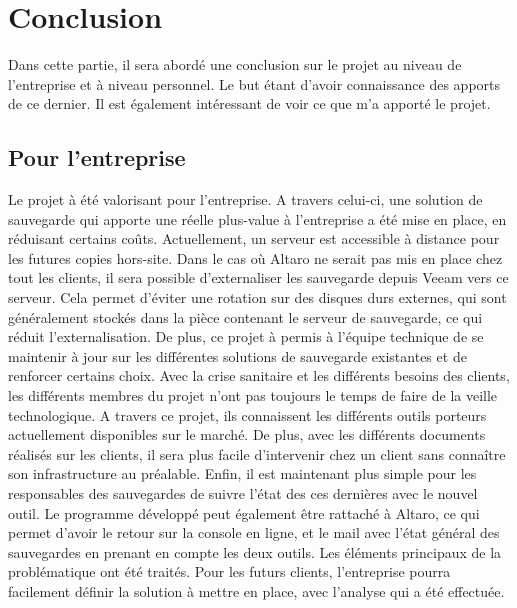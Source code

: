 \documentclass[pfe]{tnreport} %
\begin{document}
\chapter{Conclusion}

Dans cette partie, il sera abordé une conclusion sur le projet au niveau de l'entreprise et à niveau personnel. Le but étant d'avoir connaissance des apports de ce dernier. Il est également intéressant de voir ce que m'a apporté le projet. 
\section{Pour l'entreprise}

Le projet à été valorisant pour l'entreprise. A travers celui-ci, une solution de sauvegarde qui apporte une réelle plus-value à l’entreprise a été mise en place, en réduisant certains coûts. \newline
Actuellement, un serveur est accessible à distance pour les futures copies hors-site. \newline
Dans le cas où Altaro ne serait pas mis en place chez tout les clients, il sera possible d'externaliser les sauvegarde depuis Veeam vers ce serveur. \newline
Cela permet d'éviter une rotation sur des disques durs externes, qui sont généralement stockés dans la pièce contenant le serveur de sauvegarde, ce qui réduit l'externalisation. \newline
De plus, ce projet à permis à l'équipe technique de se maintenir à jour sur les différentes solutions de sauvegarde existantes et de renforcer certains choix. \newline
Avec la crise sanitaire et les différents besoins des clients, les différents membres du projet n'ont pas toujours le temps de faire de la veille technologique. \newline A travers ce projet, ils connaissent les différents outils porteurs actuellement disponibles sur le marché. \newline
De plus, avec les différents documents réalisés sur les clients, il sera plus facile d'intervenir chez un client sans connaître son infrastructure au préalable. \newline
Enfin, il est maintenant plus simple pour les responsables des sauvegardes de suivre l'état des ces dernières avec le nouvel outil. Le programme développé peut également être rattaché à Altaro, ce qui permet d'avoir le retour sur la console en ligne, et le mail avec l'état général des sauvegardes en prenant en compte les deux outils. \newline
Les éléments principaux de la problématique ont été traités. 
Pour les futurs clients, l'entreprise pourra facilement définir la solution à mettre en place, avec l'analyse qui a été effectuée. \newpage
\end{document}
